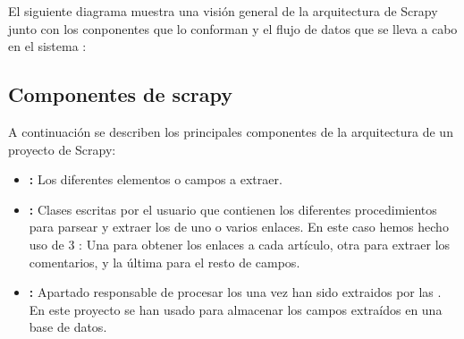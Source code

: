 El siguiente diagrama muestra una visión general de la arquitectura de Scrapy junto con los conponentes que lo conforman y el flujo de datos que se lleva a cabo en el sistema \cite{scrapy:arch}:
 
 
 \subsection{Componentes de scrapy}
 
 A continuación se describen los principales componentes de la arquitectura de un proyecto de Scrapy:
 
\begin{itemize}
    \item \textbf{:} Los diferentes elementos o campos a extraer.
    \item \textbf{:} Clases escritas por el usuario que contienen los diferentes procedimientos para parsear y extraer los  de uno o varios enlaces. En este caso hemos hecho uso de 3 : Una para obtener los enlaces a cada artículo, otra para extraer los comentarios, y la última para el resto de campos.
    \item \textbf{:} Apartado responsable de procesar los  una vez han sido extraidos por las . En este proyecto se han usado para almacenar los campos extraídos en una base de datos.
\end{itemize}

